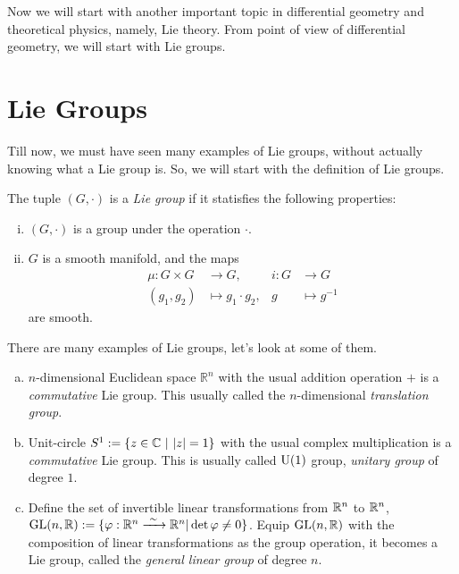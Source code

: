 
Now we will start with another important topic in differential geometry and theoretical physics, namely, Lie theory. From point of view of differential geometry, we will start with Lie groups.

\section{Lie Groups}

Till now, we must have seen many examples of Lie groups, without actually knowing what a Lie group is. So, we will start with the definition of Lie groups.

\begin{definition}
    The tuple \((G, \cdot)\) is a \emph{Lie group} if it statisfies the following properties:
    \begin{enumerate}[(i)]
        \item \((G, \cdot)\) is a group under the operation \(\cdot\).
        \item \(G\) is a smooth manifold, and the maps\footnotemark
              \begin{align*}
                  \mu: G \times G & \to G,                 & i: G & \to G          \\
                  (g_1, g_2)      & \mapsto g_1 \cdot g_2, & g    & \mapsto g^{-1}
              \end{align*}
              are smooth.
    \end{enumerate}
\end{definition}
There are many examples of Lie groups, let's look at some of them.
\begin{example}
    \phantom{l}\vspace{-1.5em}
    \begin{enumerate}[(a)]
        \item \(n\)-dimensional Euclidean space \(\mathbb{R}^n\) with the usual addition operation \(+\) is a \emph{commutative} Lie group. This usually called the \(n\)-dimensional \emph{translation group}.
        \item Unit-circle \(S^1 := \qty{z \in \mathbb C\ \middle|\ |z| = 1}\) with the usual complex multiplication is a \emph{commutative} Lie group. This is usually called \(\operatorname{U}(1)\) group, \emph{unitary group} of degree \(1\).
        \item Define the set of invertible linear transformations from \(\mathbb R^n\) to \(\mathbb R^n\), \(\operatorname{GL}(n, \mathbb R) := \{\varphi: \mathbb R^n \xrightarrow{\ \sim\ } \mathbb R^n | \det\varphi \ne 0\}\). Equip \(\operatorname{GL}(n, \mathbb R)\) with the composition of linear transformations as the group operation, it becomes a Lie group, called the \emph{general linear group} of degree \(n\).
    \end{enumerate}
\end{example}

